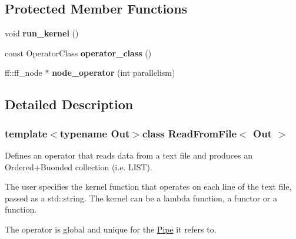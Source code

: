 \subsection*{\-Protected \-Member \-Functions}
\begin{DoxyCompactItemize}
\item 
\hypertarget{class_read_from_file_af1d716032c6d0b662aba9318584b14ff}{void {\bfseries run\-\_\-kernel} ()}\label{class_read_from_file_af1d716032c6d0b662aba9318584b14ff}

\item 
\hypertarget{class_read_from_file_a1cb0beec0a2db61f86dea66931373726}{const \-Operator\-Class {\bfseries operator\-\_\-class} ()}\label{class_read_from_file_a1cb0beec0a2db61f86dea66931373726}

\item 
\hypertarget{class_read_from_file_ad341538708a9737c6909256367a3e6fe}{ff\-::ff\-\_\-node $\ast$ {\bfseries node\-\_\-operator} (int parallelism)}\label{class_read_from_file_ad341538708a9737c6909256367a3e6fe}

\end{DoxyCompactItemize}


\subsection{\-Detailed \-Description}
\subsubsection*{template$<$typename Out$>$class Read\-From\-File$<$ Out $>$}

\-Defines an operator that reads data from a text file and produces an \-Ordered+\-Buonded collection (i.\-e. \-L\-I\-S\-T).

\-The user specifies the kernel function that operates on each line of the text file, passed as a std\-::string. \-The kernel can be a lambda function, a functor or a function.

\-The operator is global and unique for the \hyperlink{class_pipe}{\-Pipe} it refers to. 

